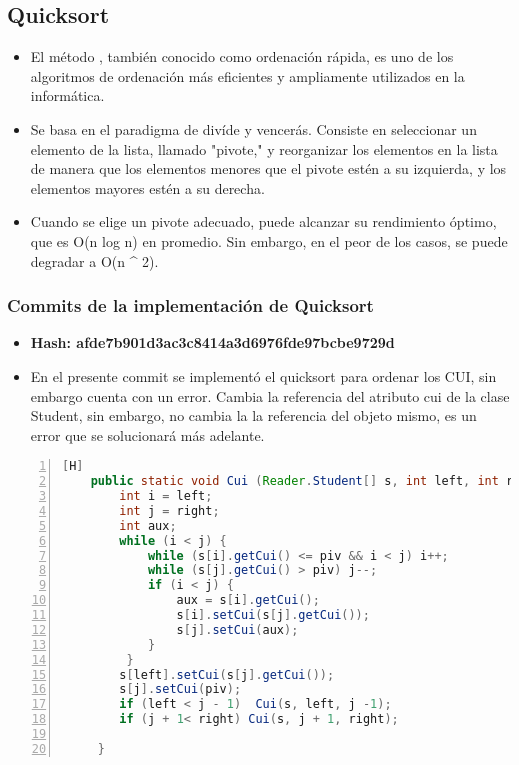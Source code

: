 \subsection{Quicksort}
	\begin{itemize}	
        \item El método , también conocido como ordenación rápida, es uno de los algoritmos de ordenación más eficientes y ampliamente utilizados en la informática. 
        \item Se basa en el paradigma de divíde y vencerás. Consiste en seleccionar un elemento de la lista, llamado "pivote," y reorganizar los elementos en la lista de manera que los elementos menores que el pivote estén a su izquierda, y los elementos mayores estén a su derecha.
        \item Cuando se elige un pivote adecuado,  puede alcanzar su rendimiento óptimo, que es O(n log n) en promedio. Sin embargo, en el peor de los casos, se puede degradar a O(n  ^ 2).
	\end{itemize}	


\subsubsection{Commits de la implementación de Quicksort}
  \begin{itemize}
    \item \textbf{Hash: afde7b901d3ac3c8414a3d6976fde97bcbe9729d}
    \item En el presente commit se implementó el quicksort para ordenar los CUI, sin embargo cuenta con un error. Cambia la referencia del atributo cui de la clase Student, sin embargo, no cambia la la referencia del objeto mismo, es un error que se solucionará más adelante. 
  \end{itemize}
    \begin{lstlisting}[language=Java, caption={Commit: Se implementó Quicksort para cui}, numbers=left, firstnumber=1][H]
    public static void Cui (Reader.Student[] s, int left, int right) {
        int i = left;
        int j = right;
        int aux;
        while (i < j) {
            while (s[i].getCui() <= piv && i < j) i++;
            while (s[j].getCui() > piv) j--;
            if (i < j) {
                aux = s[i].getCui();
                s[i].setCui(s[j].getCui()); 
                s[j].setCui(aux);
            }
         }
        s[left].setCui(s[j].getCui());
        s[j].setCui(piv);
        if (left < j - 1)  Cui(s, left, j -1);
        if (j + 1< right) Cui(s, j + 1, right);
        
     }
    \end{lstlisting}



